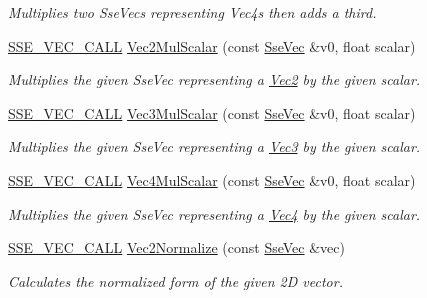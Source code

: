 \begin{DoxyCompactItemize}
\begin{DoxyCompactList}\small\item\em Multiplies two Sse\+Vecs representing Vec4s then adds a third. \end{DoxyCompactList}\item 
\hyperlink{ssevec__math__defs_8h_a97454f977a5281455cecacce1e8ba670}{S\+S\+E\+\_\+\+V\+E\+C\+\_\+\+C\+A\+L\+L} \hyperlink{group___s_i_m_d_vec_math_ga90100e65d1b4a3217e9d0591a47d9e8f}{Vec2\+Mul\+Scalar} (const \hyperlink{namespacegfxmath_a0de2243e2b8d0fd46d3af5e036423004}{Sse\+Vec} \&v0, float scalar)
\begin{DoxyCompactList}\small\item\em Multiplies the given Sse\+Vec representing a \hyperlink{classgfxmath_1_1_vec2}{Vec2} by the given scalar. \end{DoxyCompactList}\item 
\hyperlink{ssevec__math__defs_8h_a97454f977a5281455cecacce1e8ba670}{S\+S\+E\+\_\+\+V\+E\+C\+\_\+\+C\+A\+L\+L} \hyperlink{group___s_i_m_d_vec_math_ga2700cc382394a8a220d6ceba22c627a8}{Vec3\+Mul\+Scalar} (const \hyperlink{namespacegfxmath_a0de2243e2b8d0fd46d3af5e036423004}{Sse\+Vec} \&v0, float scalar)
\begin{DoxyCompactList}\small\item\em Multiplies the given Sse\+Vec representing a \hyperlink{classgfxmath_1_1_vec3}{Vec3} by the given scalar. \end{DoxyCompactList}\item 
\hyperlink{ssevec__math__defs_8h_a97454f977a5281455cecacce1e8ba670}{S\+S\+E\+\_\+\+V\+E\+C\+\_\+\+C\+A\+L\+L} \hyperlink{group___s_i_m_d_vec_math_ga7a731cf65284e07919a28d6254aa21b6}{Vec4\+Mul\+Scalar} (const \hyperlink{namespacegfxmath_a0de2243e2b8d0fd46d3af5e036423004}{Sse\+Vec} \&v0, float scalar)
\begin{DoxyCompactList}\small\item\em Multiplies the given Sse\+Vec representing a \hyperlink{classgfxmath_1_1_vec4}{Vec4} by the given scalar. \end{DoxyCompactList}\item 
\hyperlink{ssevec__math__defs_8h_a97454f977a5281455cecacce1e8ba670}{S\+S\+E\+\_\+\+V\+E\+C\+\_\+\+C\+A\+L\+L} \hyperlink{group___s_i_m_d_vec_math_ga448768708884eea249d85a7f73effb57}{Vec2\+Normalize} (const \hyperlink{namespacegfxmath_a0de2243e2b8d0fd46d3af5e036423004}{Sse\+Vec} \&vec)
\begin{DoxyCompactList}\small\item\em Calculates the normalized form of the given 2\+D vector. \end{DoxyCompactList}\item 

\end{DoxyCompactItemize}
